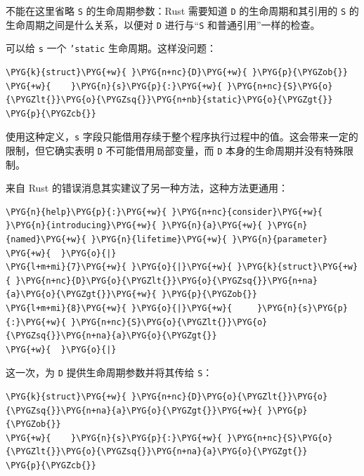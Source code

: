 不能在这里省略 \texttt{S} 的生命周期参数：Rust 需要知道 \texttt{D} 的生命周期和其引用的 \texttt{S} 的生命周期之间是什么关系，以便对 \texttt{D} 进行与“\texttt{S} 和普通引用”一样的检查。

可以给 \texttt{s} 一个 \texttt{'static} 生命周期。这样没问题：

\begin{Verbatim}[commandchars=\\\{\},breaklines=true,breakanywhere=true,fontsize=\codefont,xleftmargin=17bp]
\PYG{k}{struct}\PYG{+w}{ }\PYG{n+nc}{D}\PYG{+w}{ }\PYG{p}{\PYGZob{}}
\PYG{+w}{    }\PYG{n}{s}\PYG{p}{:}\PYG{+w}{ }\PYG{n+nc}{S}\PYG{o}{\PYGZlt{}}\PYG{o}{\PYGZsq{}}\PYG{n+nb}{static}\PYG{o}{\PYGZgt{}}
\PYG{p}{\PYGZcb{}}
\end{Verbatim}

使用这种定义，\texttt{s} 字段只能借用存续于整个程序执行过程中的值。这会带来一定的限制，但它确实表明 \texttt{D} 不可能借用局部变量，而 \texttt{D} 本身的生命周期并没有特殊限制。

来自 Rust 的错误消息其实建议了另一种方法，这种方法更通用：

\begin{Verbatim}[commandchars=\\\{\},breaklines=true,breakanywhere=true,fontsize=\codefont,xleftmargin=17bp]
\PYG{n}{help}\PYG{p}{:}\PYG{+w}{ }\PYG{n+nc}{consider}\PYG{+w}{ }\PYG{n}{introducing}\PYG{+w}{ }\PYG{n}{a}\PYG{+w}{ }\PYG{n}{named}\PYG{+w}{ }\PYG{n}{lifetime}\PYG{+w}{ }\PYG{n}{parameter}
\PYG{+w}{  }\PYG{o}{|}
\PYG{l+m+mi}{7}\PYG{+w}{ }\PYG{o}{|}\PYG{+w}{ }\PYG{k}{struct}\PYG{+w}{ }\PYG{n+nc}{D}\PYG{o}{\PYGZlt{}}\PYG{o}{\PYGZsq{}}\PYG{n+na}{a}\PYG{o}{\PYGZgt{}}\PYG{+w}{ }\PYG{p}{\PYGZob{}}
\PYG{l+m+mi}{8}\PYG{+w}{ }\PYG{o}{|}\PYG{+w}{     }\PYG{n}{s}\PYG{p}{:}\PYG{+w}{ }\PYG{n+nc}{S}\PYG{o}{\PYGZlt{}}\PYG{o}{\PYGZsq{}}\PYG{n+na}{a}\PYG{o}{\PYGZgt{}}
\PYG{+w}{  }\PYG{o}{|}
\end{Verbatim}

这一次，为 \texttt{D} 提供生命周期参数并将其传给 \texttt{S}：

\begin{Verbatim}[commandchars=\\\{\},breaklines=true,breakanywhere=true,fontsize=\codefont,xleftmargin=17bp]
\PYG{k}{struct}\PYG{+w}{ }\PYG{n+nc}{D}\PYG{o}{\PYGZlt{}}\PYG{o}{\PYGZsq{}}\PYG{n+na}{a}\PYG{o}{\PYGZgt{}}\PYG{+w}{ }\PYG{p}{\PYGZob{}}
\PYG{+w}{    }\PYG{n}{s}\PYG{p}{:}\PYG{+w}{ }\PYG{n+nc}{S}\PYG{o}{\PYGZlt{}}\PYG{o}{\PYGZsq{}}\PYG{n+na}{a}\PYG{o}{\PYGZgt{}}
\PYG{p}{\PYGZcb{}}
\end{Verbatim}

